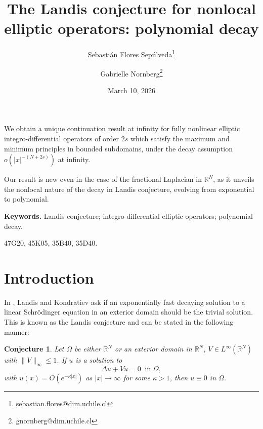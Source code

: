 \documentclass[a4paper,11pt]{article}
\newcommand{\R}{\mathbb{R}}
\newtheorem{conjecture}{Conjecture}
\begin{document}
	
	
		\title{\bf\Large The Landis conjecture for nonlocal elliptic operators: polynomial decay}
	\author[1]{Sebastián Flores Sepúlveda\footnote{sebastian.flores@dim.uchile.cl}}
	\author[2]{Gabrielle Nornberg\footnote{gnornberg@dim.uchile.cl}}


	{\date{March 10, 2026}}

	\maketitle

	{\small{}
	We obtain a unique continuation result at infinity for fully nonlinear elliptic integro-differential operators of order $2s$ which satisfy the maximum and minimum principles in bounded subdomains, under the decay assumption $o(|x|^{-(N+2s)})$ at infinity.

	Our result is new even in the case of the fractional Laplacian in $\R^N$, as it unveils the nonlocal nature of the decay in Landis conjecture, evolving from exponential to polynomial.

		\smallskip
	\noindent \textbf{Keywords.} {Landis conjecture; integro-differential elliptic operators; polynomial decay.}
	\smallskip

	 {47G20,  45K05, 35B40, 35D40.}
	}

	\medskip
		

\section{Introduction}

In \cite{kondratiev_qualitative_1988}, Landis and Kondratiev ask if an exponentially fast decaying solution to a linear Schrödinger equation in an exterior domain should be the trivial solution. This is known as the Landis conjecture and can be stated in the following manner:

\begin{conjecture}
Let $\Omega$ be either $\R^N$ or an exterior domain in $\R^N$, $V \in L^{\infty}(\R^N)$ with $\|V\|_{\infty} \leq 1$. If $u$ is a solution to 
\[\Delta u + Vu= 0 ~\text{ in }\Omega,\]
with $u(x) = O(e^{-\kappa |x|})$ as $|x| \rightarrow \infty$ for some $\kappa >1$, then $u \equiv 0$ in $\Omega$.
\end{conjecture}
\end{document}
